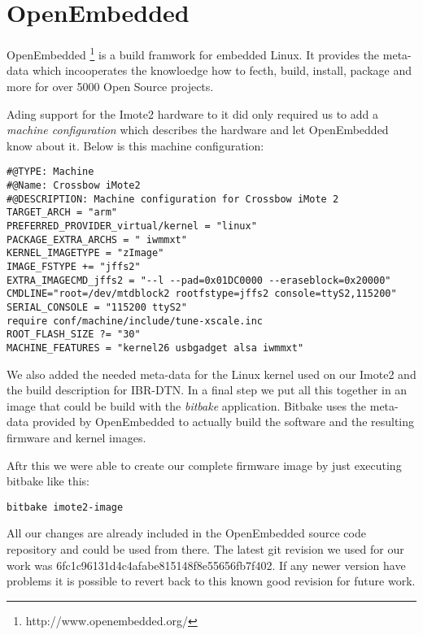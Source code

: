 \chapter{OpenEmbedded}
\label{annexoe}

OpenEmbedded \footnote{http://www.openembedded.org/} is a build framwork for
embedded Linux. It provides the meta-data which incooperates the knowloedge how
to fecth, build, install, package and more for over 5000 Open Source projects.

Ading support for the Imote2 hardware to it did only required us to add a
\emph{machine configuration} which describes the hardware and let OpenEmbedded
know about it. Below is this machine configuration:

\begin{verbatim}
#@TYPE: Machine
#@Name: Crossbow iMote2
#@DESCRIPTION: Machine configuration for Crossbow iMote 2
TARGET_ARCH = "arm"
PREFERRED_PROVIDER_virtual/kernel = "linux"
PACKAGE_EXTRA_ARCHS = " iwmmxt"
KERNEL_IMAGETYPE = "zImage"
IMAGE_FSTYPE += "jffs2"
EXTRA_IMAGECMD_jffs2 = "--l --pad=0x01DC0000 --eraseblock=0x20000"
CMDLINE="root=/dev/mtdblock2 rootfstype=jffs2 console=ttyS2,115200"
SERIAL_CONSOLE = "115200 ttyS2"
require conf/machine/include/tune-xscale.inc
ROOT_FLASH_SIZE ?= "30"
MACHINE_FEATURES = "kernel26 usbgadget alsa iwmmxt"
\end{verbatim}

We also added the needed meta-data for the Linux kernel used on our Imote2 and
the build description for IBR-DTN. In a final step we put all this together in
an image that could be build with the \emph{bitbake} application. Bitbake uses
the meta-data provided by OpenEmbedded to actually build the software and the
resulting firmware and kernel images.

Aftr this we were able to create our complete firmware image by just executing
bitbake like this:

\begin{verbatim}
bitbake imote2-image
\end{verbatim}

All our changes are already included in the OpenEmbedded source code repository
and could be used from there. The latest git revision we used for our work was
6fc1c96131d4c4afabe815148f8e55656fb7f402. If any newer version have problems it
is possible to revert back to this known good revision for future work.
